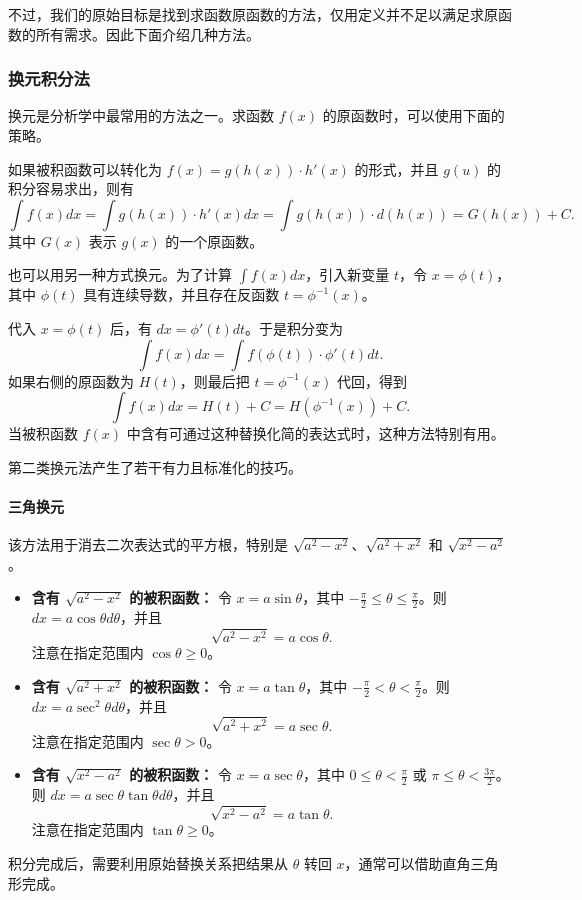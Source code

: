 不过，我们的原始目标是找到求函数原函数的方法，仅用定义并不足以满足求原函数的所有需求。因此下面介绍几种方法。

\subsubsection{换元积分法}
换元是分析学中最常用的方法之一。求函数 $f(x)$ 的原函数时，可以使用下面的策略。

\begin{definition}[第一类换元积分法]
如果被积函数可以转化为 $f(x)=g(h(x))\cdot h'(x)$ 的形式，并且 $g(u)$ 的积分容易求出，则有
\[
\int f(x)dx=\int g(h(x))\cdot h'(x)dx=\int g(h(x))\cdot d(h(x))=G(h(x))+C.
\]
其中 $G(x)$ 表示 $g(x)$ 的一个原函数。
\end{definition}

\begin{definition}[第二类换元积分法]
也可以用另一种方式换元。为了计算 $\int f(x)dx$，引入新变量 $t$，令 $x=\phi(t)$，其中 $\phi(t)$ 具有连续导数，并且存在反函数 $t=\phi^{-1}(x)$。

代入 $x=\phi(t)$ 后，有 $dx=\phi'(t)dt$。于是积分变为
\[
\int f(x)dx=\int f(\phi(t))\cdot \phi'(t)dt.
\]
如果右侧的原函数为 $H(t)$，则最后把 $t=\phi^{-1}(x)$ 代回，得到
\[
\int f(x)dx=H(t)+C=H(\phi^{-1}(x))+C.
\]
当被积函数 $f(x)$ 中含有可通过这种替换化简的表达式时，这种方法特别有用。
\end{definition}

第二类换元法产生了若干有力且标准化的技巧。

\paragraph{三角换元}
该方法用于消去二次表达式的平方根，特别是 $\sqrt{a^2-x^2}$、$\sqrt{a^2+x^2}$ 和 $\sqrt{x^2-a^2}$。

\begin{itemize}
    \item \textbf{含有 $\sqrt{a^2-x^2}$ 的被积函数：}
    令 $x=a\sin\theta$，其中 $-\frac{\pi}{2}\le \theta\le \frac{\pi}{2}$。则 $dx=a\cos\theta d\theta$，并且
    \[
    \sqrt{a^2-x^2}=a\cos\theta.
    \]
    注意在指定范围内 $\cos\theta\ge 0$。

    \item \textbf{含有 $\sqrt{a^2+x^2}$ 的被积函数：}
    令 $x=a\tan\theta$，其中 $-\frac{\pi}{2}<\theta<\frac{\pi}{2}$。则 $dx=a\sec^2\theta d\theta$，并且
    \[
    \sqrt{a^2+x^2}=a\sec\theta.
    \]
    注意在指定范围内 $\sec\theta>0$。

    \item \textbf{含有 $\sqrt{x^2-a^2}$ 的被积函数：}
    令 $x=a\sec\theta$，其中 $0\le \theta<\frac{\pi}{2}$ 或 $\pi\le \theta<\frac{3\pi}{2}$。则 $dx=a\sec\theta\tan\theta d\theta$，并且
    \[
    \sqrt{x^2-a^2}=a\tan\theta.
    \]
    注意在指定范围内 $\tan\theta\ge 0$。
\end{itemize}
积分完成后，需要利用原始替换关系把结果从 $\theta$ 转回 $x$，通常可以借助直角三角形完成。


